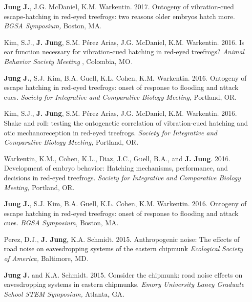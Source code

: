 \documentclass[margin,line]{res}
\begin{document}
\begin{resume}
\vspace{-.25cm}
{\bf Jung J.}, J.G. McDaniel, K.M. Warkentin. {2017.} {Ontogeny of vibration-cued escape-hatching in red-eyed treefrogs: two reasons older embryos hatch more.} {\it BGSA Symposium,} {Boston, MA.}

\vspace{-.25cm}
Kim, S.J., {\bf J. Jung}, S.M. Pérez Arias, J.G. McDaniel, K.M. Warkentin. {2016.} {Is ear function necessary for vibration-cued hatching in red-eyed treefrogs?} {\it Animal Behavior Society Meeting} {, Colombia, MO.}

\vspace{-.25cm}
{\bf Jung J.}, S.J. Kim, B.A. Guell, K.L. Cohen, K.M. Warkentin. {2016.} {Ontogeny of escape hatching in red-eyed treefrogs: onset of response to flooding and attack cues.} {\it Society for Integrative and Comparative Biology Meeting,} {Portland, OR.}

\vspace{-.25cm}
Kim, S.J., {\bf J. Jung}, S.M. Pérez Arias, J.G. McDaniel, K.M. Warkentin. {2016.} {Shake and roll: testing the ontogenetic correlation of vibration-cued hatching and otic mechanoreception in red-eyed treefrogs.} {\it Society for Integrative and Comparative Biology Meeting,} {Portland, OR.}

\vspace{-.25cm}
Warkentin, K.M., Cohen, K.L., Diaz, J.C., Guell, B.A., and {\bf J. Jung}. {2016.} {Development of embryo behavior: Hatching mechanisms, performance, and decisions in red-eyed treefrogs.} {\it Society for Integrative and Comparative Biology Meeting,} {Portland, OR.}

\vspace{-.25cm}
{\bf Jung J.}, S.J. Kim, B.A. Guell, K.L. Cohen, K.M. Warkentin. {2016.} {Ontogeny of escape hatching in red-eyed treefrogs: onset of response to flooding and attack cues.} {\it BGSA Symposium,} {Boston, MA.}

\vspace{-.25cm}
Perez, D.J., {\bf J. Jung}, K.A. Schmidt. {2015.} {Anthropogenic noise: The effects of road noise on eavesdropping systems of the eastern chipmunk} {\it Ecological Society of America,} {Baltimore, MD.}

\vspace{-.25cm}
{\bf Jung J.} and K.A. Schmidt. {2015.} {Consider the chipmunk: road noise effects on eavesdropping systems in eastern chipmunks.} {\it Emory University Laney Graduate School STEM Symposium,} {Atlanta, GA. }


\end{resume}
\end{document}
